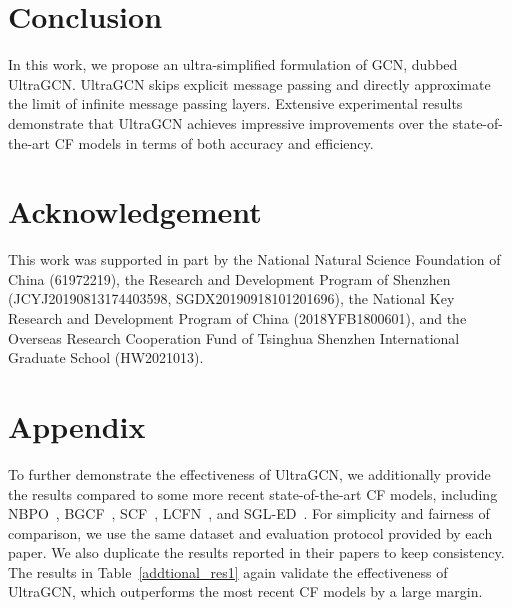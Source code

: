 \documentclass[sigconf,authorversion]{acmart}
\begin{document}
 \vspace{-1.5ex}
\section{Conclusion}
In this work, we propose an ultra-simplified formulation of GCN, dubbed UltraGCN. UltraGCN skips explicit message passing and directly approximate the limit of infinite message passing layers. 
Extensive experimental results demonstrate that UltraGCN achieves impressive improvements over the state-of-the-art CF models in terms of both accuracy and efficiency.



\section{Acknowledgement}
This work was supported in part by the National Natural Science Foundation of China (61972219), the Research and Development Program of Shenzhen (JCYJ20190813174403598, SGDX20190918101201696), the National Key Research and Development Program of China (2018YFB1800601), and the Overseas Research Cooperation Fund of Tsinghua Shenzhen International Graduate School
(HW2021013). \section{Appendix}

To further demonstrate the effectiveness of UltraGCN, we additionally provide the results compared to some more recent state-of-the-art CF models, including NBPO~\cite{NBPO}, BGCF~\cite{BGCF}, SCF~\cite{SpectralCF}, LCFN~\cite{LCFN}, and SGL-ED~\cite{SGL-ED}. For simplicity and fairness of comparison, we use the same dataset and evaluation protocol provided by each paper. We also duplicate the results reported in their papers to keep consistency. The results in Table~\ref{addtional_res1} again validate the effectiveness of UltraGCN, which outperforms the most recent CF models by a large margin.

\vspace{-1.5ex}
\end{document}
